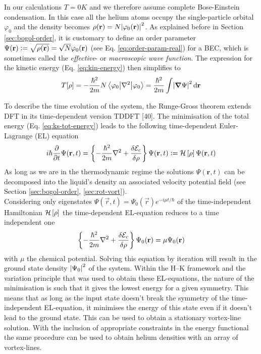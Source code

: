 	In our calculations $T=0\unit{K}$ and we therefore assume complete Bose-Einstein condensation. In this case all the helium atoms occupy the single-particle orbital $\varphi_0$ and the density becomes $\rho(\vec{r})=N\absolutevalue{\varphi_0(\vec{r})}^2$. As explained before in Section \ref{sec:bogol-order}, it is customary to define an order parameter $\Psi(\vec{r})\vcentcolon=\sqrt{\rho(\vec{r})}=\sqrt{N}\varphi_0(\vec{r})$ (see Eq. \ref{eq:order-param-real}) for a BEC, which is sometimes called the \emph{effective}- or \emph{macroscopic wave function}. The expression for the kinetic energy (Eq. \ref{eq:kin-energy}) then simplifies to
	\begin{align}
		T[\rho] =
		-\frac{\hbar^2}{2m} N \ev**{\laplacian}{\varphi_0} = \frac{\hbar^2}{2m} \int\! \abs{\grad{\Psi}}^2\diff{r} \label{eq5}
	\end{align}
	
	To describe the time evolution of the system, the Runge-Gross theorem extends DFT in its time-dependent version TDDFT [40]. The minimisation of the total energy (Eq. \ref{eq:ks-tot-energy}) leads to the following time-dependent Euler-Lagrange (EL) equation 
	\begin{align}
		i\hbar\frac{\partial}{\partial t} \Psi({\mathbf r},t) = \left\{-\frac{\hbar^2}{2m}\laplacian + \fdv{\mathcal{E}_c}{\rho}\right\}\Psi(\textbf{r},t) \vcentcolon= {\cal H}\left[\rho\right]\Psi(\textbf{r},t) 
		\label{eq:td-el-equation}
	\end{align}
	As long as we are in the thermodynamic regime the solutions $\Psi(\textbf{r},t)$ can be decomposed into the liquid's density an associated velocity potential field (see Section \ref{sec:bogol-order}, \ref{sec:rot-vort}).\\
	
	Considering only eigenstates $\Psi(\vec{r},t)=\Psi_0(\vec{r})\unit{e}^{-i\mu t/\hbar}$ of the time-independent Hamiltonian ${\cal H}\left[\rho\right]$ the time-dependent EL-equation reduces to a time independent one
	\begin{align}
		\left\{-\frac{\hbar^2}{2m} \laplacian + \fdv{\mathcal{E}_c}{\rho}\right\}\Psi_0(\textbf{r}) = \mu\Psi_0(\textbf{r})
		\label{eq:el-equation}
	\end{align}
	with $\mu$ the chemical potential. Solving this equation by iteration will result in the ground state density $\abs{\Psi_0}^2$ of the system. Within the H--K framework and the variation principle that was used to obtain these EL-equations, the nature of the minimisation is such that it gives the lowest energy for a given symmetry. This means that as long as the input state doesn't break the symmetry of the time-independent EL-equation, it minimises the energy of this state even if it doesn't lead to the ground state. This can be used to obtain a stationary vortex-line solution. With the inclusion of appropriate constraints in the energy functional the same procedure can be used to obtain helium densities with an array of vortex-lines.   

